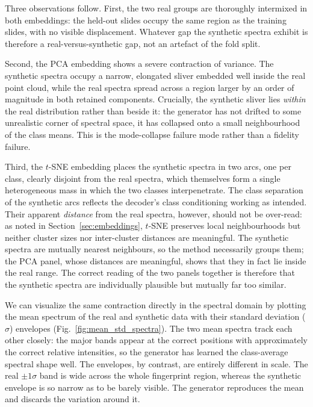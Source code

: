 Three observations follow. First, the two real groups are thoroughly intermixed in both
embeddings: the held-out slides occupy the same region as the training slides, with no visible
displacement. Whatever gap the synthetic spectra exhibit is therefore a real-versus-synthetic
gap, not an artefact of the fold split.

Second, the PCA embedding shows a severe contraction of variance. The synthetic spectra occupy
a narrow, elongated sliver embedded well inside the real point cloud, while the real spectra
spread across a region larger by an order of magnitude in both retained components. Crucially,
the synthetic sliver lies \emph{within} the real distribution rather than beside it: the
generator has not drifted to some unrealistic corner of spectral space, it has collapsed onto
a small neighbourhood of the class means. This is the mode-collapse failure mode rather than a
fidelity failure.

Third, the $t$-SNE embedding places the synthetic spectra in two arcs, one per class, clearly
disjoint from the real spectra, which themselves form a single heterogeneous mass in which the
two classes interpenetrate. The class separation of the synthetic arcs reflects the decoder's
class conditioning working as intended. Their apparent \emph{distance} from the real spectra,
however, should not be over-read: as noted in Section~\ref{sec:embeddings}, $t$-SNE preserves
local neighbourhoods but neither cluster sizes nor inter-cluster distances are meaningful. The
synthetic spectra are mutually nearest neighbours, so the method necessarily groups them; the
PCA panel, whose distances are meaningful, shows that they in fact lie inside the real range.
The correct reading of the two panels together is therefore that the synthetic spectra are
individually plausible but mutually far too similar.


We can visualize the same contraction directly in the spectral domain by plotting the mean
spectrum of the real and synthetic data with their standard deviation ($\sigma$) envelopes
(Fig.~\ref{fig:mean_std_spectra}). The two mean spectra track each other closely: the major
bands appear at the correct positions with approximately the correct relative intensities, so
the generator has learned the class-average spectral shape well. The envelopes, by contrast,
are entirely different in scale. The real $\pm 1\sigma$ band is wide across the whole
fingerprint region, whereas the synthetic envelope is so narrow as to be barely visible. The
generator reproduces the mean and discards the variation around it.

